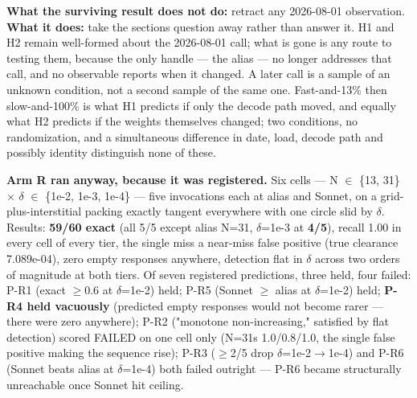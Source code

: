 \textbf{What the surviving result does not do:} retract any 2026-08-01 observation. \textbf{What it does:} take the section\textquotesingle s question away rather than answer it. H1 and H2 remain well-formed about the 2026-08-01 call; what is gone is any route to testing them, because the only handle --- the alias --- no longer addresses that call, and no observable reports when it changed. A later call is a sample of an unknown condition, not a second sample of the same one. Fast-and-13\% then slow-and-100\% is what H1 predicts if only the decode path moved, and equally what H2 predicts if the weights themselves changed; two conditions, no randomization, and a simultaneous difference in date, load, decode path and possibly identity distinguish none of these.

\textbf{Arm R ran anyway, because it was registered.} Six cells --- N \(\in\) \{13, 31\} \(\times\) \(\delta\) \(\in\) \{1e-2, 1e-3, 1e-4\} --- five invocations each at alias and Sonnet, on a grid-plus-interstitial packing exactly tangent everywhere with one circle slid by \(\delta\). Results: \textbf{59/60 exact} (all 5/5 except alias N=31, \(\delta\)=1e-3 at \textbf{4/5}), recall 1.00 in every cell of every tier, the single miss a near-miss false positive (true clearance 7.089e-04), zero empty responses anywhere, detection flat in \(\delta\) across two orders of magnitude at both tiers. Of seven registered predictions, three held, four failed: P-R1 (exact \(\geq\)0.6 at \(\delta\)=1e-2) held; P-R5 (Sonnet \(\geq\) alias at \(\delta\)=1e-2) held; \textbf{P-R4 held vacuously} (predicted empty responses would not become rarer --- there were zero anywhere); P-R2 ("monotone non-increasing," satisfied by flat detection) scored FAILED on one cell only (N=31\textquotesingle s 1.0/0.8/1.0, the single false positive making the sequence rise); P-R3 (\(\geq\)2/5 drop \(\delta\)=1e-2\(\rightarrow\)1e-4) and P-R6 (Sonnet beats alias at \(\delta\)=1e-4) both failed outright --- P-R6 became structurally unreachable once Sonnet hit ceiling.

